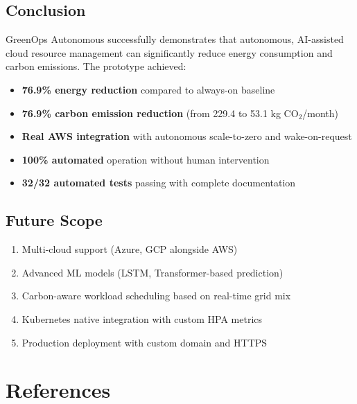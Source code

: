 \documentclass[12pt,a4paper]{report}
\begin{document}
\section{Conclusion}

GreenOps Autonomous successfully demonstrates that autonomous, AI-assisted cloud resource management can significantly reduce energy consumption and carbon emissions. The prototype achieved:

\begin{itemize}
    \item \textbf{76.9\% energy reduction} compared to always-on baseline
    \item \textbf{76.9\% carbon emission reduction} (from 229.4 to 53.1 kg CO$_2$/month)
    \item \textbf{Real AWS integration} with autonomous scale-to-zero and wake-on-request
    \item \textbf{100\% automated} operation without human intervention
    \item \textbf{32/32 automated tests} passing with complete documentation
\end{itemize}

\section{Future Scope}

\begin{enumerate}
    \item Multi-cloud support (Azure, GCP alongside AWS)
    \item Advanced ML models (LSTM, Transformer-based prediction)
    \item Carbon-aware workload scheduling based on real-time grid mix
    \item Kubernetes native integration with custom HPA metrics
    \item Production deployment with custom domain and HTTPS
\end{enumerate}

\chapter*{References}
\end{document}
